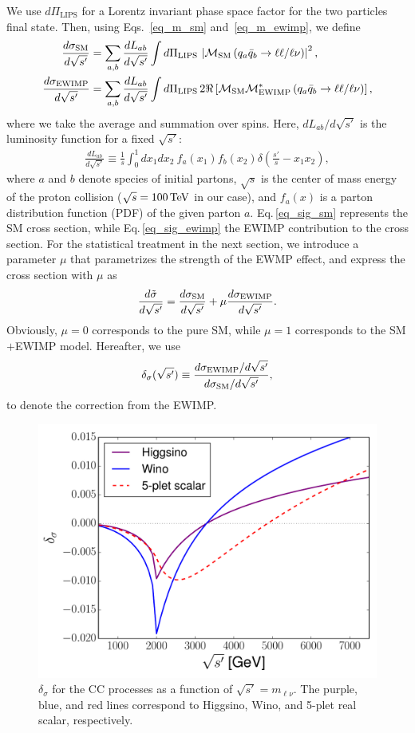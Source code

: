 \documentclass[12pt,twoside,book]{article}
\begin{document}
We use $d\Pi_{\mathrm{LIPS}}$ for a Lorentz invariant phase space factor for the two particles final state.  Then, using Eqs.~\eqref{eq_m_sm} and~\eqref{eq_m_ewimp}, we define
\begin{align}
 \frac{d \sigma_{\rm SM}}{d\sqrt{s'}} &= \sum_{a,b}
 \frac{dL_{ab}}{d\sqrt{s'}} \int d\Pi_{\mathrm{LIPS}}\, \left| \mathcal{M}_{\rm SM} \left( q_a
 \bar{q}_b \to \ell\ell / \ell\nu \right) \right|^2,\label{eq_sig_sm}\\
 \frac{d \sigma_{\rm EWIMP}}{d\sqrt{s'}} &= \sum_{a,b}
 \frac{dL_{ab}}{d\sqrt{s'}} \int d\Pi_{\mathrm{LIPS}}\, 2 \Re \left[ \mathcal{M}_{\rm SM}
 \mathcal{M}_{\rm EWIMP}^{*} \left( q_a \bar{q}_b \to \ell\ell / \ell\nu
 \right) \right],\label{eq_sig_ewimp}
\end{align}
where we take the average and summation over spins.  Here,
$dL_{ab} / d\sqrt{s'}$ is the luminosity function for a fixed
$\sqrt{s'}$:
\begin{align}
 \frac{d L_{ab}}{d\sqrt{s'}} \equiv \frac{1}{s} \int_0^1 dx_1
 dx_2~f_a(x_1) f_b(x_2) \delta\left(\frac{s'}{s} - x_1 x_2\right),
\end{align}
where $a$ and $b$ denote species of initial partons, $\sqrt{s}$ is the
center of mass energy of the proton collision ($\sqrt{s} = 100\,{\rm
  TeV}$ in our case), and $f_a(x)$ is a parton distribution function
(PDF) of the given parton $a$.  Eq.\,\eqref{eq_sig_sm} represents the
SM cross section, while Eq.\,\eqref{eq_sig_ewimp} the EWIMP
contribution to the cross section.  For the statistical treatment in
the next section, we introduce a parameter $\mu$ that parametrizes the
strength of the EWMP effect, and express the cross section with $\mu$
as
\begin{align}
 \frac{d\tilde{\sigma}}{d\sqrt{s'}} =
 \frac{d\sigma_{\rm SM}}{d\sqrt{s'}}
 + \mu \frac{d\sigma_{\rm EWIMP}}{d\sqrt{s'}}.
 \label{eq_diffcrosssection}
\end{align}
Obviously, $\mu=0$ corresponds to the pure SM, while $\mu=1$ corresponds to
the SM$+$EWIMP model.  Hereafter, we use
\begin{align}
 \delta_\sigma ( \sqrt{s'} ) \equiv \frac{d\sigma_{\rm
 EWIMP} / d\sqrt{s'}}{d\sigma_{\rm SM} /
 d\sqrt{s'}},\label{eq_dsigma}
\end{align}
to denote the correction from the EWIMP.

\begin{figure}[t]
 \centering
 \includegraphics[width=0.5\hsize]{sqsp_vs_del.pdf}
 \caption{$\delta_\sigma$ for the CC processes as a
 function of $\sqrt{s'} = m_{\ell\nu}$.  The purple, blue, and red
 lines correspond to Higgsino, Wino, and 5-plet real scalar,
 respectively.}  \label{fig_sqsp_vs_del}
\end{figure}
\end{document}
